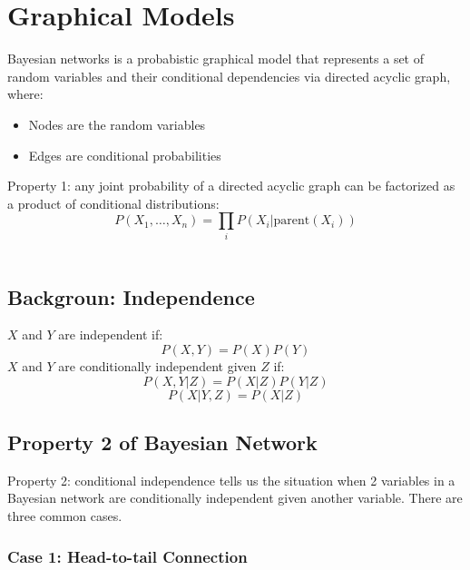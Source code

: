 \chapter{Graphical Models}

\begin{multicols}{2}
\noindent Bayesian networks is a probabistic graphical model that represents a set of random variables and their conditional dependencies via directed acyclic graph, where:
\begin{itemize}
    \item Nodes are the random variables
    \item Edges are conditional probabilities
\end{itemize}

\noindent Property 1: any joint probability of a directed acyclic graph can be factorized as a product of conditional distributions:
$$P(X_1,\ldots,X_n) = \prod_i P(X_i|\text{parent}(X_i))$$ \\

\section{Backgroun: Independence}

\noindent $X$ and $Y$ are independent if:
$$P(X,Y) = P(X)P(Y)$$
\noindent $X$ and $Y$ are conditionally independent given $Z$ if:
$$P(X,Y|Z) = P(X|Z) P(Y|Z)$$
$$P(X|Y,Z) = P(X|Z)$$

\section{Property 2 of Bayesian Network}

\noindent Property 2: conditional independence tells us the situation when 2 variables in a Bayesian network are conditionally independent given another variable. There are three common cases.

\subsection{Case 1: Head-to-tail Connection}
\begin{center}
\end{center}


\end{multicols}
